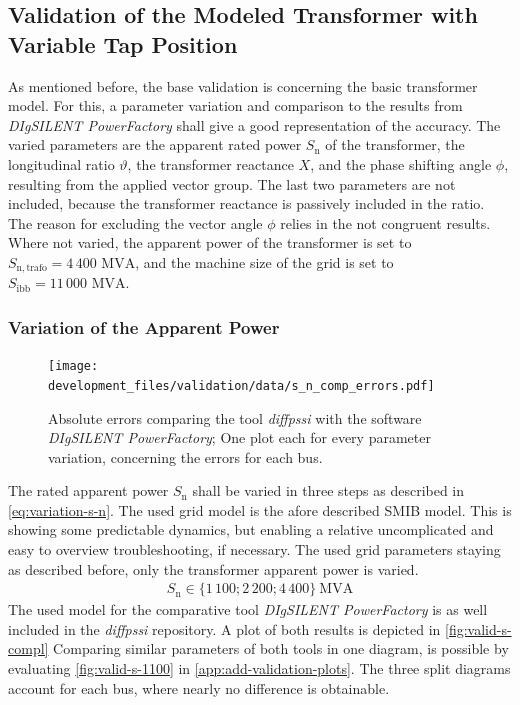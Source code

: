 \subsection{Validation of the Modeled Transformer with Variable Tap Position}

As mentioned before, the base validation is concerning the basic transformer model.
For this, a parameter variation and comparison to the results from \textit{DIgSILENT PowerFactory} shall give a good representation of the accuracy.
The varied parameters are the apparent rated power $S_\mathrm{n}$ of the transformer, the longitudinal ratio $\vartheta$, the transformer reactance $X$, and the phase shifting angle $\phi$, resulting from the applied vector group.
The last two parameters are not included, because the transformer reactance is passively included in the ratio.
The reason for excluding the vector angle $\phi$ relies in the not congruent results.
Where not varied, the apparent power of the transformer is set to $S_\mathrm{n,trafo}=4\,400\text{ MVA}$, and the machine size of the grid is set to $S_\mathrm{ibb}=11\,000\text{ MVA}$.

\subsubsection{Variation of the Apparent Power}

\begin{figure}[htb!]
    \centering
    \texttt{[image: development\_files/validation/data/s\_n\_comp\_errors.pdf]}
    \caption[Model error comparison concerning the variation of the rated apparent power]{Absolute errors comparing the tool \textit{diffpssi} with the software \textit{DIgSILENT PowerFactory}; One plot each for every parameter variation, concerning the errors for each bus.}
    \label{fig:valid-s-errors}
\end{figure}

The rated apparent power $S_\mathrm{n}$ shall be varied in three steps as described in \autoref{eq:variation-s-n}. 
The used grid model is the afore described \acs{SMIB} model. 
This is showing some predictable dynamics, but enabling a relative uncomplicated and easy to overview troubleshooting, if necessary.
The used grid parameters staying as described before, only the transformer apparent power is varied.
\begin{align}
    S_\mathrm{n} \in \{ 1\,100; 2\,200; 4\,400 \}~\mathrm{MVA} \label{eq:variation-s-n}
\end{align}
The used model for the comparative tool \textit{DIgSILENT PowerFactory} is as well included in the \textit{diffpssi} repository.
A plot of both results is depicted in \autoref{fig:valid-s-compl}
Comparing similar parameters of both tools in one diagram, is possible by evaluating \autoref{fig:valid-s-1100} in \autoref{app:add-validation-plots}.
The three split diagrams account for each bus, where nearly no difference is obtainable.

